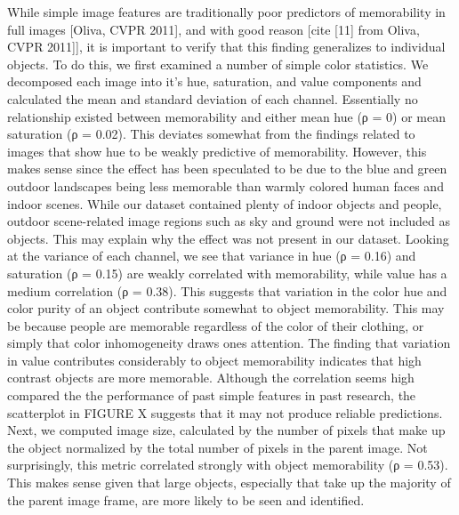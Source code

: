 While simple image features are traditionally poor predictors of memorability in full images [Oliva, CVPR 2011], and with good reason [cite [11] from Oliva, CVPR 2011]], it is important to verify that this finding generalizes to individual objects. To do this, we first examined a number of simple color statistics. We decomposed each image into it's hue, saturation, and value components and calculated the mean and standard deviation of each channel. Essentially no relationship existed between memorability and either mean hue (ρ = 0) or mean saturation (ρ = 0.02). This deviates somewhat from the findings related to images that show hue to be weakly predictive of memorability. However, this makes sense since the effect has been speculated to be due to the blue and green outdoor landscapes being less memorable than warmly colored human faces and indoor scenes. While our dataset contained plenty of indoor objects and people, outdoor scene-related image regions such as sky and ground were not included as objects. This may explain why the effect was not present in our dataset. Looking at the variance of each channel, we see that variance in hue (ρ = 0.16) and saturation (ρ = 0.15) are weakly correlated with memorability, while value has a medium correlation (ρ = 0.38). This suggests that variation in the color hue and color purity of an object contribute somewhat to object memorability. This may be because people are memorable regardless of the color of their clothing, or simply that color inhomogeneity draws ones attention. The finding that variation in value contributes considerably to object memorability indicates that high contrast objects are more memorable. Although the correlation seems high compared the the performance of past simple features in past research, the scatterplot in FIGURE X suggests that it may not produce reliable predictions. Next, we computed image size, calculated by the number of pixels that make up the object normalized by the total number of pixels in the parent image. Not surprisingly, this metric correlated strongly with object memorability (ρ = 0.53). This makes sense given that large objects, especially that take up the majority of the parent image frame, are more likely to be seen and identified. 